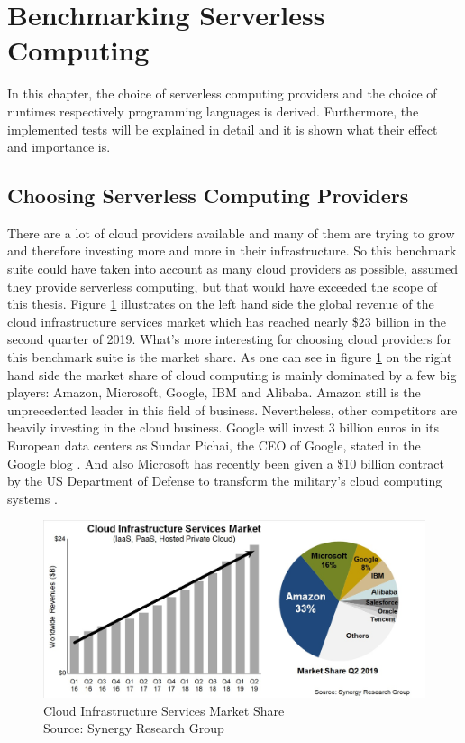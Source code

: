 \section{Benchmarking Serverless Computing}
In this chapter, the choice of serverless computing providers and the choice of runtimes respectively programming languages is derived. Furthermore, the implemented tests will be explained in detail and it is shown what their effect and importance is.

\subsection{Choosing Serverless Computing Providers}
\label{sec:CSP}

There are a lot of cloud providers available and many of them are trying to grow and therefore investing more and more in their infrastructure. So this benchmark suite could have taken into account as many cloud providers as possible, assumed they provide serverless computing, but that would have exceeded the scope of this thesis. Figure \ref{fig:market_share} illustrates on the left hand side the global revenue of the cloud infrastructure services market which has reached nearly \$23 billion in the second quarter of 2019. What's more interesting for choosing cloud providers for this benchmark suite is the market share. As one can see in figure \ref{fig:market_share} on the right hand side the market share of cloud computing is mainly dominated by a few big players: Amazon, Microsoft, Google, \gls{IBM} and Alibaba. Amazon still is the unprecedented leader in this field of business. Nevertheless, other competitors are heavily investing in the cloud business. Google will invest 3 billion euros in its European data centers as Sundar Pichai, the \gls{CEO} of Google, stated in the Google blog \cite{GoogleBlog}. And also Microsoft has recently been given a \$10 billion contract by the US Department of Defense to transform the military's cloud computing systems \cite{NYJEDI, JEDI}.

\begin{figure}[htp]
\begin{center}
\includegraphics[scale=0.6]{bilder/synergy.jpg}
\captionsetup[table]{justification=centering, labelfont=bf}
\caption[Cloud Infrastructure Services Market Share]{Cloud Infrastructure Services Market Share\\Source: Synergy Research Group \cite{Synergy}}
\label{fig:market_share}
\end{center}
\end{figure}

